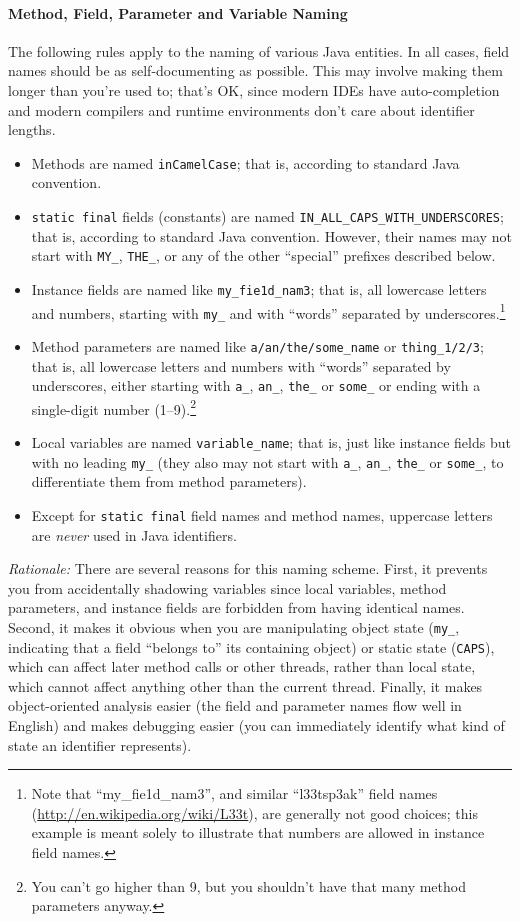 \paragraph{Method, Field, Parameter and Variable Naming}

The following rules apply to the naming of various Java entities. In
all cases, field names should be as self-documenting as possible. This
may involve making them longer than you're used to; that's OK, since
modern IDEs have auto-completion and modern compilers and runtime
environments don't care about identifier lengths.
%
\begin{itemize}
\item Methods are named \texttt{inCamelCase}; that is, according to
  standard Java convention.
\item \texttt{static final} fields (constants) are named
  \texttt{IN\_ALL\_CAPS\_WITH\_UNDERSCORES}; that is, according to
  standard Java convention. However, their names may not start with
  \texttt{MY\_}, \texttt{THE\_}, or any of the other ``special''
  prefixes described below.
\item Instance fields are named like \texttt{my\_fie1d\_nam3}; that
  is, all lowercase letters and numbers, starting with \texttt{my\_}
  and with ``words'' separated by underscores.\footnote{Note that
    ``my\_fie1d\_nam3'', and similar ``l33tsp3ak'' field names
    (\url{http://en.wikipedia.org/wiki/L33t}), are generally not good
    choices; this example is meant solely to illustrate that numbers
    are allowed in instance field names.}
\item Method parameters are named like
  \texttt{a/an/the/some\_name} or \texttt{thing\_1/2/3}; that is,
  all lowercase letters and numbers with ``words'' separated by
  underscores, either starting with \texttt{a\_}, \texttt{an\_},
  \texttt{the\_} or \texttt{some\_} or ending with a single-digit
  number (1--9).\footnote{You can't go higher than 9, but you
    shouldn't have that many method parameters anyway.}
\item Local variables are named \texttt{variable\_name}; that is, just
  like instance fields but with no leading \texttt{my\_} (they also
  may not start with \texttt{a\_}, \texttt{an\_}, \texttt{the\_} or
  \texttt{some\_}, to differentiate them from method parameters).
\item Except for \texttt{static final} field names and method names,
  uppercase letters are \emph{never} used in Java identifiers.
\end{itemize}
%
\emph{Rationale:} There are several reasons for this naming scheme. First, it
prevents you from accidentally shadowing variables since local
variables, method parameters, and instance fields are forbidden from
having identical names. Second, it makes it obvious when you are
manipulating object state (\texttt{my\_}, indicating that a field
``belongs to'' its containing object) or static state (\texttt{CAPS}),
which can affect later method calls or other threads, rather than
local state, which cannot affect anything other than the current
thread. Finally, it makes object-oriented analysis easier (the field
and parameter names flow well in English) and makes debugging easier
(you can immediately identify what kind of state an identifier
represents).

